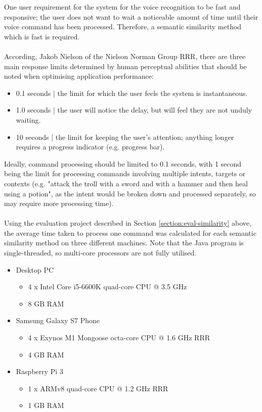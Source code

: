 \documentclass[11pt]{article}
\begin{document}
One user requirement for the system for the voice recognition to be fast and responsive; the user does not want to wait a noticeable amount of time until their voice command has been processed. Therefore, a semantic similarity method which is fast is required.
\\
\\
According, Jakob Nielson of the Nielson Norman Group RRR, there are three main response limits determined by human perceptual abilities that should be noted when optimising application performance:

\begin{itemize}
\item 0.1 seconds | the limit for which the user feels the system is instantaneous.
\item 1.0 seconds | the user will notice the delay, but will feel they are not unduly waiting.
\item 10 seconds | the limit for keeping the user's attention; anything longer requires a progress indicator (e.g. progress bar).
\end{itemize}

Ideally, command processing should be limited to 0.1 seconds, with 1 second being the limit for processing commands involving multiple intents, targets or contexts (e.g. "attack the troll with a sword and with a hammer and then heal using a potion", as the intent would be broken down and processed separately, so may require more processing time).
\\
\\
Using the evaluation project described in Section \ref{section:eval-similarity} above, the average time taken to process one command was calculated for each semantic similarity method on three different machines. Note that the Java program is single-threaded, so multi-core processors are not fully utilised.

\begin{itemize}
\item Desktop PC
	\begin{itemize}
	\item 4 x Intel Core i5-6600K quad-core CPU @ 3.5 GHz
	\item 8 GB RAM
	\end{itemize}
\item Samsung Galaxy S7 Phone
	\begin{itemize}
	\item 4 x Exynos M1 Mongoose octa-core CPU @ 1.6 GHz RRR
	\item 4 GB RAM
	\end{itemize}
\item Raspberry Pi 3
	\begin{itemize}
	\item 1 x ARMv8 quad-core CPU @ 1.2 GHz RRR
	\item 1 GB RAM
	\end{itemize}
\end{itemize}
\end{document}
